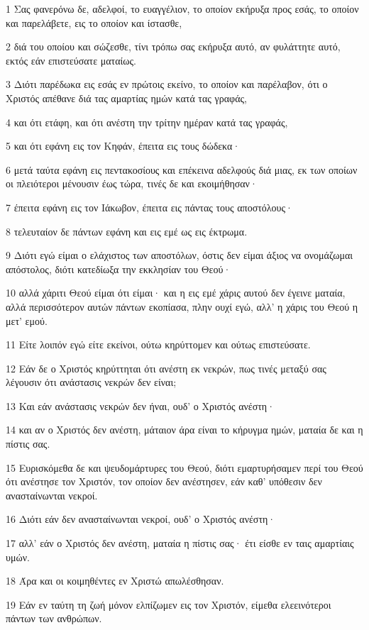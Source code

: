 \par 1 Σας φανερόνω δε, αδελφοί, το ευαγγέλιον, το οποίον εκήρυξα προς εσάς, το οποίον και παρελάβετε, εις το οποίον και ίστασθε,
\par 2 διά του οποίου και σώζεσθε, τίνι τρόπω σας εκήρυξα αυτό, αν φυλάττητε αυτό, εκτός εάν επιστεύσατε ματαίως.
\par 3 Διότι παρέδωκα εις εσάς εν πρώτοις εκείνο, το οποίον και παρέλαβον, ότι ο Χριστός απέθανε διά τας αμαρτίας ημών κατά τας γραφάς,
\par 4 και ότι ετάφη, και ότι ανέστη την τρίτην ημέραν κατά τας γραφάς,
\par 5 και ότι εφάνη εις τον Κηφάν, έπειτα εις τους δώδεκα·
\par 6 μετά ταύτα εφάνη εις πεντακοσίους και επέκεινα αδελφούς διά μιας, εκ των οποίων οι πλειότεροι μένουσιν έως τώρα, τινές δε και εκοιμήθησαν·
\par 7 έπειτα εφάνη εις τον Ιάκωβον, έπειτα εις πάντας τους αποστόλους·
\par 8 τελευταίον δε πάντων εφάνη και εις εμέ ως εις έκτρωμα.
\par 9 Διότι εγώ είμαι ο ελάχιστος των αποστόλων, όστις δεν είμαι άξιος να ονομάζωμαι απόστολος, διότι κατεδίωξα την εκκλησίαν του Θεού·
\par 10 αλλά χάριτι Θεού είμαι ότι είμαι· και η εις εμέ χάρις αυτού δεν έγεινε ματαία, αλλά περισσότερον αυτών πάντων εκοπίασα, πλην ουχί εγώ, αλλ' η χάρις του Θεού η μετ' εμού.
\par 11 Είτε λοιπόν εγώ είτε εκείνοι, ούτω κηρύττομεν και ούτως επιστεύσατε.
\par 12 Εάν δε ο Χριστός κηρύττηται ότι ανέστη εκ νεκρών, πως τινές μεταξύ σας λέγουσιν ότι ανάστασις νεκρών δεν είναι;
\par 13 Και εάν ανάστασις νεκρών δεν ήναι, ουδ' ο Χριστός ανέστη·
\par 14 και αν ο Χριστός δεν ανέστη, μάταιον άρα είναι το κήρυγμα ημών, ματαία δε και η πίστις σας.
\par 15 Ευρισκόμεθα δε και ψευδομάρτυρες του Θεού, διότι εμαρτυρήσαμεν περί του Θεού ότι ανέστησε τον Χριστόν, τον οποίον δεν ανέστησεν, εάν καθ' υπόθεσιν δεν ανασταίνωνται νεκροί.
\par 16 Διότι εάν δεν ανασταίνωνται νεκροί, ουδ' ο Χριστός ανέστη·
\par 17 αλλ' εάν ο Χριστός δεν ανέστη, ματαία η πίστις σας· έτι είσθε εν ταις αμαρτίαις υμών.
\par 18 Άρα και οι κοιμηθέντες εν Χριστώ απωλέσθησαν.
\par 19 Εάν εν ταύτη τη ζωή μόνον ελπίζωμεν εις τον Χριστόν, είμεθα ελεεινότεροι πάντων των ανθρώπων.
